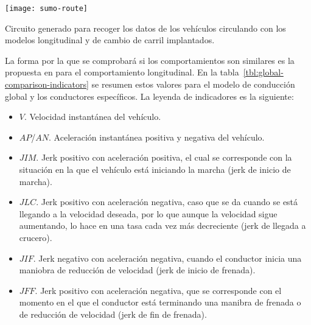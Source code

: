 \begin{marginfigure}
	\centering
	\texttt{[image: sumo-route]}
	\caption[Circuito de prueba en el entorno virtual]{Circuito generado para recoger los datos de los vehículos circulando con los modelos longitudinal y de cambio de carril implantados.}
	\label{fig:sumo-route}
\end{marginfigure}

La forma por la que se comprobará si los comportamientos son similares es la propuesta en \cite{DiazAlvarez2014} para el comportamiento longitudinal. En la tabla~\ref{tbl:global-comparison-indicators} se resumen estos valores para el modelo de conducción global y los conductores específicos. La leyenda de indicadores es la siguiente:

\begin{itemize}
	\item $V$. Velocidad instantánea del vehículo.
	\item $AP$/$AN$. Aceleración instantánea positiva y negativa del vehículo.
	\item $JIM$. Jerk positivo con aceleración positiva, el cual se corresponde con la situación en la que el vehículo está iniciando la marcha (jerk de inicio de marcha).
	\item $JLC$. Jerk positivo con aceleración negativa, caso que se da cuando se está llegando a la velocidad deseada, por lo que aunque la velocidad sigue aumentando, lo hace en una tasa cada vez más decreciente (jerk de llegada a crucero).
	\item $JIF$. Jerk negativo con aceleración negativa, cuando el conductor inicia una maniobra de reducción de velocidad (jerk de inicio de frenada).
	\item $JFF$. Jerk positivo con aceleración negativa, que se corresponde con el momento en el que el conductor está terminando una manibra de frenada o de reducción de velocidad (jerk de fin de frenada).
\end{itemize}

